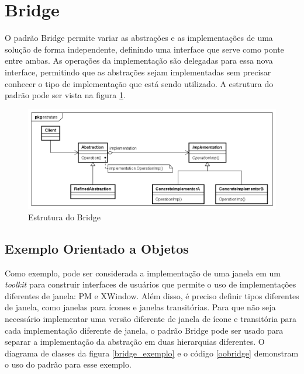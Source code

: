 \section{Bridge}

O padrão Bridge permite variar as abstrações e as 
implementações de uma solução de forma independente, 
definindo uma interface que serve como ponte entre ambas. 
As operações da implementação são delegadas para essa 
nova interface, permitindo que as abstrações sejam 
implementadas sem precisar conhecer o tipo de 
implementação que está sendo utilizado. A estrutura do 
padrão pode ser vista na figura \ref{bridge_struct}.\cite{gamma:1995}

\begin{figure}[htb]
	\caption{\label{bridge_struct}Estrutura do Bridge}
	\begin{center}
	    \includegraphics[scale=0.5]{5_padroes-contexto-funcional/5.2_estruturais/5.2.2_bridge/bridge_estrutura.png}
	\end{center}
\end{figure}

\subsection*{Exemplo Orientado a Objetos}

Como exemplo, pode ser considerada a implementação de 
uma janela em um \textit{toolkit} para construir interfaces 
de usuários que permite o uso de implementações diferentes 
de janela: PM e XWindow. Além disso, é preciso definir tipos 
diferentes de janela, como janelas para ícones e janelas 
transitórias. Para que não seja necessário implementar 
uma versão diferente de janela de ícone e transitória 
para cada implementação diferente de janela, o padrão 
Bridge pode ser usado para separar a implementação 
da abstração em duas hierarquias diferentes. O diagrama 
de classes da figura \ref{bridge_exemplo} e o código 
\ref{oobridge} demonstram o uso do padrão para esse 
exemplo.

